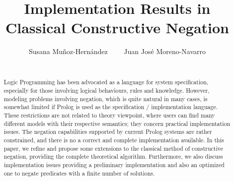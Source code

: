 \documentclass{llncs}
\begin{document}

\title{Implementation Results in \\
       Classical Constructive Negation}

\author{Susana Mu\~{n}oz-Hern\'{a}ndez~~~~ Juan Jos\'{e} Moreno-Navarro \\
 ~~~~ }


\maketitle


%



\begin{abstract}
  Logic Programming has been advocated as a language for system
  specification, especially for those involving logical behaviours,
  rules and knowledge. However, modeling problems involving negation,
  which is quite natural in many cases, is somewhat limited if Prolog
  is used as the specification / implementation language. These
  restrictions are not related to theory viewpoint, where users can
  find many different models with their respective semantics; they
  concern practical implementation issues.  The negation capabilities
  supported by current Prolog systems are rather constrained, and
  there is no a correct and complete implementation available.  
  In this paper,
  we refine and propose some extensions to the classical method of
  constructive negation, providing the complete theoretical
  algorithm. Furthermore, we also discuss implementation issues
  providing a preliminary implementation and also an optimized
  one to negate predicates with a finite number of
  solutions.
\end{abstract}
\end{document}
